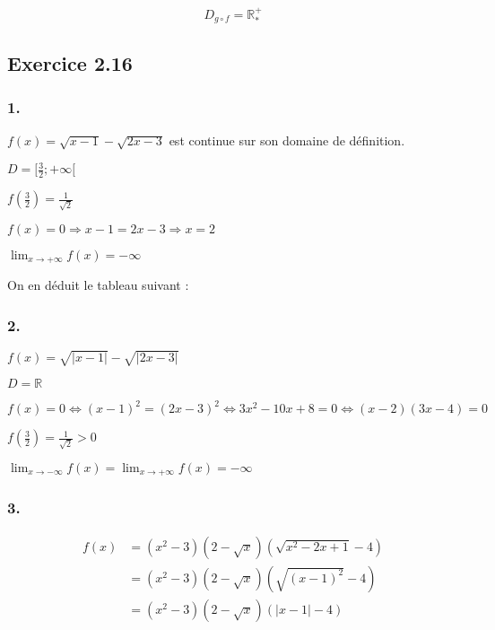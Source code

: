 \documentclass{report}
\begin{document}
\begin{displaymath}
	D_{g \circ f} = \mathbb{R}^{+}_{*}
\end{displaymath}


\subsection*{Exercice 2.16}
\subsubsection*{1.}
$f(x) = \sqrt{x-1} - \sqrt{2x-3}$ est continue sur son domaine de définition.

$D = [\frac{3}{2} ; +\infty[$

$f(\frac{3}{2}) = \frac{1}{\sqrt{2}}$

$f(x) = 0 \Rightarrow x-1 = 2x-3 \Rightarrow x = 2 $

$\lim_{x \rightarrow +\infty} f(x) = -\infty$

On en déduit le tableau suivant :


\subsubsection*{2.}
$f(x) = \sqrt{|x-1|} - \sqrt{|2x-3|}$

$D = \mathbb{R}$

$f(x) = 0 \Longleftrightarrow (x-1)^2 = (2x-3)^2 \Longleftrightarrow 3x^2 -10x +8 =0 \Longleftrightarrow (x-2)(3x-4) =0$

$f(\frac{3}{2}) = \frac{1}{\sqrt{2}} > 0$

$\lim_{x \rightarrow -\infty} f(x) = \lim_{x \rightarrow +\infty} f(x) = -\infty$



\subsubsection*{3.}
\begin{equation*}
	\begin{split}
		f(x) &= (x^2-3)(2-\sqrt{x})(\sqrt{x^2-2x+1}-4) \\
		     &= (x^2-3)(2-\sqrt{x})(\sqrt{(x-1)^2}-4) \\
		     &= (x^2-3)(2-\sqrt{x})(|x-1|-4) \\
	\end{split}
\end{equation*}
\end{document}
